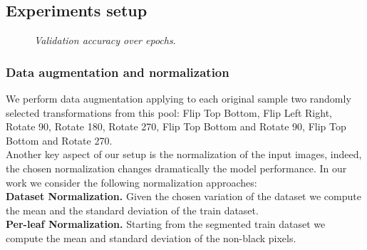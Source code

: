 \subsection{Experiments setup}
\begin{figure}
	\begin{center}
		\begin{center}
			\caption{\textit{Validation accuracy over epochs}.}
			\label{fig:tensorboard}
		\end{center}
		\vspace{-40pt}
	\end{center}
\end{figure}
\subsubsection{Data augmentation and normalization}
We perform data augmentation applying to each original sample two randomly selected transformations from this pool: Flip Top Bottom, Flip Left Right, Rotate 90\degree, Rotate 180\degree, Rotate 270\degree, Flip Top Bottom and Rotate 90\degree, Flip Top Bottom and Rotate 270\degree.
\\
Another key aspect of our setup is the normalization of the input images, indeed, the chosen normalization changes dramatically the model performance. In our work we consider the following normalization approaches:
\\
\textbf{Dataset Normalization.} Given the chosen variation of the dataset we compute the mean and the standard deviation of the train dataset.
\\
\textbf{Per-leaf Normalization.} Starting from the segmented train dataset we compute the mean and standard deviation of the non-black pixels. \vspace{-10pt}
